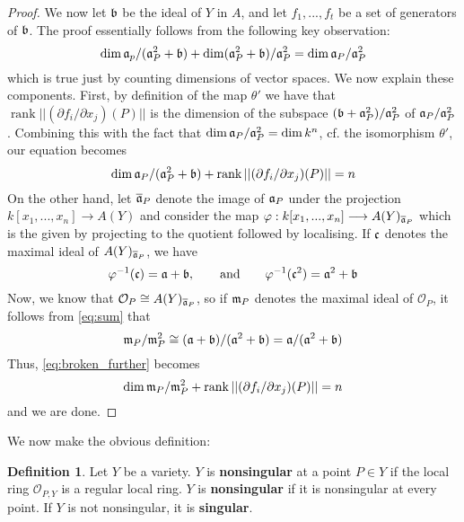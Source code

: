 \documentclass[12pt]{article}
\theoremstyle{plain}
\theoremstyle{definition}
\newtheorem{defn}[thm]{Definition} %
\newcommand{\call}[1]{\mathcal{#1}}
\newcommand{\lto}{\longrightarrow}
\begin{document}
\begin{proof}
We now let $\frak{b}$ be the ideal of $Y$ in $A$, and let $f_1,...,f_t$ be a set of generators of $\frak{b}$. The proof essentially follows from the following key observation:
\begin{equation}
\operatorname{dim}\frak{a}_p/(\frak{a}_P^2 + \frak{b}) + \operatorname{dim}(\frak{a}_P^2 + \frak{b})/\frak{a}_P^2= \operatorname{dim}\frak{a}_P/\frak{a}_P^2
\end{equation}
which is true just by counting dimensions of vector spaces. We now explain these components. First, by definition of the map $\theta'$ we have that $\operatorname{rank}||(\partial f_i/\partial x_j)(P)||$ is the dimension of the subspace $(\frak{b} + \frak{a}_P^2)/\frak{a}_P^2$ of $\frak{a}_P/\frak{a}_P^2$.  Combining this with the fact that $\operatorname{dim}\frak{a}_P/\frak{a}_P^2 = \operatorname{dim}k^n$, cf. the isomorphism $\theta'$, our equation becomes
\begin{equation}\label{eq:broken_further}
\operatorname{dim}\frak{a}_P/(\frak{a}_P^2 + \frak{b}) + \operatorname{rank}||(\partial f_i/\partial x_j)(P)||   = n
\end{equation}
On the other hand,  let $\overline{\frak{a}}_P$ denote the image of $\frak{a}_P$ under the projection $k[x_1,...,x_n] \lto A(Y)$ and consider the map $\varphi: k[x_1,...,x_n] \lto A(Y)_{\overline{\frak{a}}_P}$ which is the given by projecting to the quotient followed by localising. If $\frak{c}$ denotes the maximal ideal of $A(Y)_{\overline{\frak{a}}_P}$, we have
\begin{equation}\label{eq:sum}
\varphi^{-1}(\frak{c}) = \frak{a} + \frak{b},\qquad\text{and}\qquad\varphi^{-1}(\frak{c}^2) = \frak{a}^2 + \frak{b}
\end{equation}
Now, we know that $\call{O}_P \cong A(Y)_{\overline{\frak{a}}_P}$, so if $\frak{m}_P$ denotes the maximal ideal of $\call{O}_P$, it follows from \eqref{eq:sum} that
\begin{equation}
\frak{m}_P/\frak{m}_P^2 \cong (\frak{a} + \frak{b})/(\frak{a}^2 + \frak{b}) = \frak{a}/(\frak{a}^2 + \frak{b})
\end{equation}
Thus, \eqref{eq:broken_further} becomes
\begin{equation}
\operatorname{dim}\frak{m}_P/\frak{m}_P^2 + \operatorname{rank}||(\partial f_i/\partial x_j)(P)||   = n
\end{equation}
and we are done.
\end{proof}
We now make the obvious definition:
\begin{defn}
Let $Y$ be a variety. $Y$ is \textbf{nonsingular} at a point $P \in Y$ if the local ring $\call{O}_{P,Y}$ is a regular local ring. $Y$ is \textbf{nonsingular} if it is nonsingular at every point. If $Y$ is not nonsingular, it is \textbf{singular}.
\end{defn}
\end{document}
